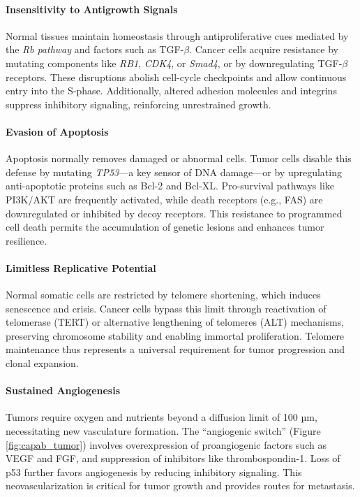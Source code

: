 \documentclass[10pt]{extarticle}
\begin{document}
\paragraph{Insensitivity to Antigrowth Signals}
Normal tissues maintain homeostasis through antiproliferative cues mediated by the \textit{Rb pathway} and factors such as TGF-$\beta$. Cancer cells acquire resistance by mutating components like \textit{RB1}, \textit{CDK4}, or \textit{Smad4}, or by downregulating TGF-$\beta$ receptors. These disruptions abolish cell-cycle checkpoints and allow continuous entry into the S-phase. Additionally, altered adhesion molecules and integrins suppress inhibitory signaling, reinforcing unrestrained growth.

\paragraph{Evasion of Apoptosis}
Apoptosis normally removes damaged or abnormal cells. Tumor cells disable this defense by mutating \textit{TP53}—a key sensor of DNA damage—or by upregulating anti-apoptotic proteins such as Bcl-2 and Bcl-XL. Pro-survival pathways like PI3K/AKT are frequently activated, while death receptors (e.g., FAS) are downregulated or inhibited by decoy receptors. This resistance to programmed cell death permits the accumulation of genetic lesions and enhances tumor resilience.

\paragraph{Limitless Replicative Potential}
Normal somatic cells are restricted by telomere shortening, which induces senescence and crisis. Cancer cells bypass this limit through reactivation of telomerase (TERT) or alternative lengthening of telomeres (ALT) mechanisms, preserving chromosome stability and enabling immortal proliferation. Telomere maintenance thus represents a universal requirement for tumor progression and clonal expansion.

\paragraph{Sustained Angiogenesis}
Tumors require oxygen and nutrients beyond a diffusion limit of 100 µm, necessitating new vasculature formation. The “angiogenic switch” (Figure \ref{fig:capab_tumor}) involves overexpression of proangiogenic factors such as VEGF and FGF, and suppression of inhibitors like thrombospondin-1. Loss of p53 further favors angiogenesis by reducing inhibitory signaling. This neovascularization is critical for tumor growth and provides routes for metastasis.
\end{document}

